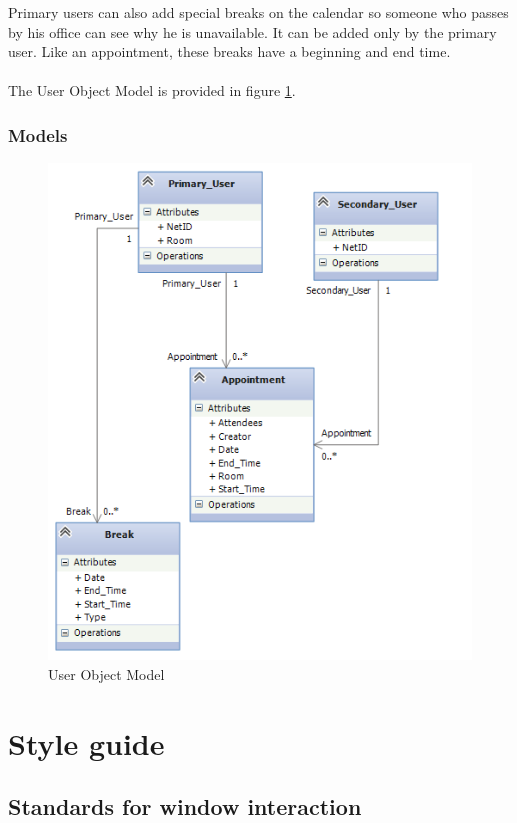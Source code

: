 \documentclass[11pt, a4paper,svglistings]{report}
\begin{document}
Primary users can also add special breaks on the calendar so someone who passes by his office can see why he is unavailable. It can be added only by the primary user. Like an appointment, these breaks have a beginning and end time. \\ \\
The User Object Model is provided in figure \ref{fig:UserObjectModel}.

\subsection{Models}

\begin{figure}[H]
\centering
    \includegraphics[width=1\textwidth]{UserObjectModels.png}
  \caption[User Object Model]{\label{fig:UserObjectModel}User Object Model}
\end{figure}

\chapter{Style guide}

\section{Standards for window interaction}
\end{document}
